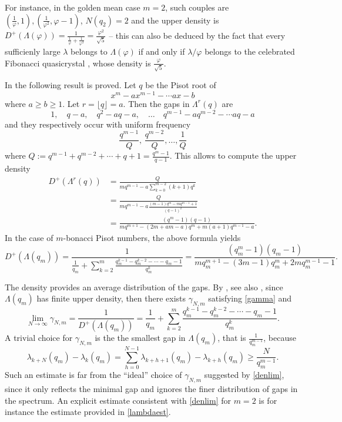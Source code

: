 \documentclass{amsart}
\begin{document}
For instance, in the golden mean case $m=2$, such couples are $(\frac{1}{\varphi},1), (\frac{1}{\varphi^2},\varphi-1)$, $N(q_2)=2$ and the upper density is $D^+(\Lambda(\varphi))=\frac{1}{\frac{1}{\varphi}+\frac{1}{\varphi^3}}=\frac{\varphi^2}{\sqrt{5}}$ -- this can also be deduced by the fact that every sufficienly large $\lambda$ belongs to $\Lambda(\varphi)$ if and only if $ \lambda/\varphi$ belongs to the celebrated Fibonacci quasicrystal \cite{H04,MPP15}, whose density is $\frac{\varphi}{\sqrt{5}}$. 

 In \cite{GH06} the following result is proved. Let $q$ be the Pisot root of 
$$x^m-ax^{m-1}-\cdots ax -b$$
where $a\geq b\geq 1$. Let $r=\lfloor q\rfloor=a$. Then the gaps in $\Lambda^{r}(q)$ are 
$$ 1,\quad q-a, \quad q^2-a q-a,\quad\dots \quad  q^{m-1}-a q^{m-2}-\cdots a q-a$$ and they respectively 
occur with uniform frequency 
$$\frac{q^{m-1}}{Q},\,\frac{q^{m-2}}{Q},\dots, \frac{1}{Q}$$
where $Q:=q^{m-1}+q^{m-2}+\cdots+q+1=\frac{q^m-1}{q-1}$. This allows to compute the upper density 
\begin{align*}D^+(\Lambda^r(q))&=
\frac{Q}
{mq^{m-1}-a\sum_{k=0}^{m-2}(k+1)q^{k}}\\
&=\frac{Q}{mq^{m-1}-a\frac{(m-1)q^{m}-mq^{m-1}+1}{(q-1)^2}}\\
&=\frac{(q^m-1)(q-1)}{mq^{m+1}-(2m+am-a)q^{m}+m(a+1)q^{m-1}-a}.
\end{align*}
In the case of $m$-bonacci Pisot numbers, the above formula yields 
$$D^+(\Lambda(q_m))= \frac{1}{\frac{1}{q_m}+\sum_{k=2}^m \frac{q_m^{k-1}-q_m^{k-2}-\cdots-q_m-1}{q_m^k}}=\frac{(q^m_m-1)(q_m-1)}{mq_m^{m+1}-(3m-1)q_m^{m}+2mq_m^{m-1}-1}.$$


The density provides an average distribution of the gaps. 
\medskip
 By \cite{bkl98}, see also \cite{komlorbook}, since $\Lambda(q_m)$ has finite upper density, then there exists $\gamma_{N,m}$ satisfying  \eqref{gamma} and 
\begin{equation}\label{denlim}\lim_{N\to \infty}\gamma_{N,m}=\frac{1}{D^+(\Lambda(q_m))}=\frac{1}{q_m}+\sum_{k=2}^m \frac{q_m^{k-1}-q_m^{k-2}-\cdots-q_m-1}{q_m^k}.\end{equation}
A trivial choice for $\gamma_{N,m}$ is the the smallest gap in $\Lambda(q_m)$, that is $\frac{1}{q_m^{m-1}}$, because 
$$\lambda_{k+N}(q_m)-\lambda_{k}(q_m)=\sum_{h=0}^{N-1}\lambda_{k+h+1}(q_m)-\lambda_{k+h}(q_m)\geq \frac{N}{q_m^{m-1}}.$$
Such an estimate is far from the “ideal” choice of $\gamma_{N,m}$ suggested by \eqref{denlim}, since it only reflects the minimal gap and ignores the finer distribution of gaps in the spectrum. An explicit estimate consistent with \eqref{denlim} for $m=2$ is for instance the estimate provided in \eqref{lambdaest}. 
\end{document}
